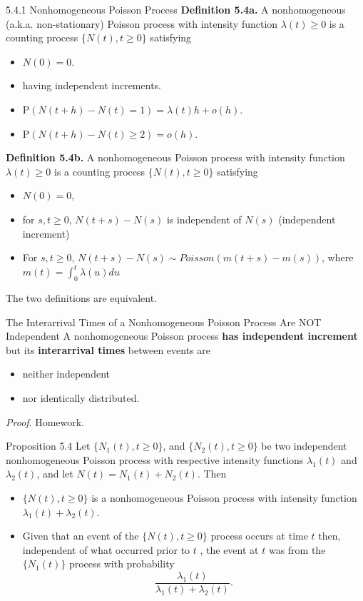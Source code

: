 \documentclass[letterpaper,handout, mathserif]{beamer}
\def\p{\mathrm P}
\begin{document}
\begin{frame}{5.4.1 Nonhomogeneous Poisson Process}\noindent
{\bf Definition 5.4a.}
A nonhomogeneous (a.k.a. non-stationary) Poisson process with intensity function $\lambda(t)\ge 0$  is a counting process $\{N(t), t\ge 0\}$ satisfying
\begin{itemize}
\item[(i)] $N(0) = 0$.
\item[(ii)] having independent increments.
\item[(iii)] $\p(N(t+h)-N(t) = 1) = \lambda(t) h+o(h)$.
\item[(iv)] $\p(N(t+h)-N(t)\ge 2) = o(h)$.
\end{itemize}\bigskip


{\bf Definition 5.4b.}
A nonhomogeneous Poisson process with intensity function $\lambda(t)\ge 0$  is a counting process $\{N(t), t\ge 0\}$ satisfying
\begin{itemize}
\item [(i)] $N(0)=0$,
\item [(ii)] for $s,t\ge 0$, $N(t+s)-N(s)$ is independent of $N(s)$ (independent increment)
\item [(iii)] For $s,t\ge 0$, $N(t+s) - N(s)\sim Poisson(m(t+s)-m(s))$, where $m(t)=\int_0^t\lambda(u)du$
\end{itemize}\medskip

The two definitions are equivalent.
\end{frame}
\begin{frame}{The Interarrival Times of a Nonhomogeneous Poisson Process Are NOT Independent}
A nonhomogeneous Poisson process {\bf has independent increment} but
its {\bf interarrival times} between events are
\begin{itemize}
\item neither independent
\item nor identically distributed.
\end{itemize}
{\it Proof}. Homework.
\end{frame}
\begin{frame}{Proposition 5.4}
Let $\{N_1(t), t\ge 0\}$, and $\{N_2(t), t\ge 0\}$ be two independent nonhomogeneous Poisson process with respective intensity functions $\lambda_1(t)$ and $\lambda_2(t)$, and let $N(t)=N_1(t)+N_2(t)$. Then\medskip
\begin{itemize}
\item[(a)] $\{N(t), t\ge 0\}$ is a nonhomogeneous Poisson process with intensity function
$\lambda_1(t)+\lambda_2(t)$.
\item[(b)] Given that an event of the $\{N(t), t\ge 0\}$ process occurs at time $t$ then, independent
of what occurred prior to $t$ , the event at $t$ was from the $\{N_1(t)\}$ process with probability
$$\frac{\lambda_1(t)}{\lambda_1(t)+\lambda_2(t)}.$$
\end{itemize}
\end{frame}
\end{document}
